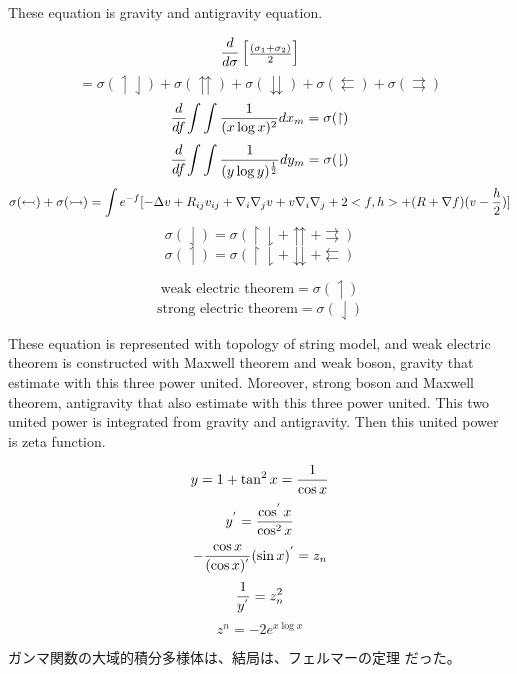 \documentclass{jsarticle}
\begin{document}
  These equation is gravity and antigravity equation. 

	   $$ {d \over d\sigma}\begin{bmatrix}{(\sigma_1 + \sigma_2) 
	   \over 2}\end{bmatrix}  $$
	   $$ = \sigma(\upharpoonleft \downharpoonleft) + \sigma(
	   \upuparrows)+ \sigma(\downdownarrows)+ 
	   \sigma(\leftleftarrows)
	   + \sigma(\rightrightarrows) $$
	   $$ {d \over df}{\int \int {1 \over (x \log x)^2}}dx_m
	   = \sigma(\upharpoonright) $$
	   $$ {d \over df}{\int \int {1 \over (y \log y)^{1 \over2}}}dy_m
	   = \sigma(\downharpoonright) $$
	   $$ \sigma(\leftarrowtail) + \sigma(\rightarrowtail)
	   = \int e^{-f}[-\Delta v + R_{ij}v_{ij} + \nabla_{i}\nabla_{j}v
	   + v\nabla_{i}\nabla_{j} + 2 <f,h> + (R + \nabla f)(v - 
	   {h \over 2})]
	   $$
	   $$ \sigma(\downharpoonleft) = \sigma(\upharpoonright 
	   \downharpoonright + \upuparrows 
	   + \rightrightarrows)$$
	   $$ \sigma(\upharpoonleft) =  \sigma(\upharpoonright 
	   \downharpoonright + \downdownarrows 
	   + \leftleftarrows) $$
         
	   $$ \text{weak electric theorem} = \sigma(\upharpoonleft) $$
	   $$ \text{strong electric theorem} = \sigma(\downharpoonleft) $$

	   These equation is represented with topology of string model,
	   and weak electric theorem is constructed with Maxwell theorem 
	   and weak boson, gravity that estimate with this three power united.
	   Moreover, strong boson and Maxwell theorem, antigravity that
	   also estimate with this three power united.
	   This two united power is integrated from gravity and antigravity.
	   Then this united power is zeta function.

	    
	   $$ y =  1 + \tan^2 x = {1 \over {\cos x}} $$
	   $$ y^{'} = {{\cos^{'}x} \over {\cos^2 x}} $$
           $$ -{{\cos x} \over (\cos x)^{'}}(\sin x)^{'} = z_n $$
	   $$ {1 \over y^{'}} = z^2_n$$
           $$ z^n = - 2 e^{x \log x} $$

	   ガンマ関数の大域的積分多様体は、結局は、フェルマーの定理
	   だった。
\end{document}
